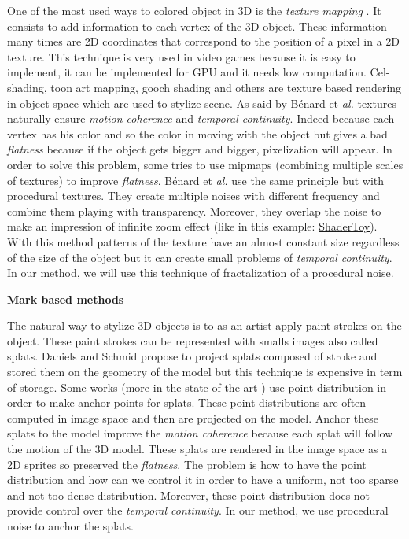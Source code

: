 One of the most used ways to colored object in 3D is the \textit{texture mapping} \cite{texture_mapping}. It consists to add information to each vertex of the 3D object. These information many times are 2D coordinates that correspond to the position of a pixel in a 2D texture. This technique is very used in video games because it is easy to implement, it can be implemented for GPU and it needs low computation. Cel-shading, toon art mapping, gooch shading and others\cite{benard_state---art_2011} are texture based rendering in object space\cite{praun_real-time_2001, klein_non-photorealistic_2000, benard_dynamic_2009, benard_dynamic_2010, freudenberg_walk-through_2001} which are used to stylize scene. As said by Bénard et \textit{al.} \cite{benard_dynamic_2009} textures naturally ensure \textit{motion coherence} and \textit{temporal continuity}. Indeed because each vertex has his color and so the color in moving with the object but gives a bad \textit{flatness} because if the object gets bigger and bigger, pixelization will appear. In order to solve this problem, some\cite{klein_non-photorealistic_2000, benard_dynamic_2009} tries to use mipmaps (combining multiple scales of textures) to improve \textit{flatness}. Bénard et \textit{al.}\cite{benard_dynamic_2010} use the same principle but with procedural textures. They create multiple noises with different frequency and combine them playing with transparency. Moreover, they overlap the noise to make an impression of infinite zoom effect (like in this example: \href{https://www.shadertoy.com/view/XlBXWw?fbclid=IwAR1fU2JxQzXtks1ZcmVmzrHiv646G8w2gWceeiV-UToeFkAFMQ2NecbsGGs}{ShaderToy}). With this method patterns of the texture have an almost constant size regardless of the size of the object but it can create small problems of \textit{temporal continuity}. In our method, we will use this technique of fractalization of a procedural noise.



\textbf{Mark based methods}

The natural way to stylize 3D objects is to as an artist apply paint strokes on the object. These paint strokes can be represented with smalls images also called splats. Daniels\cite{Daniels_1999} and Schmid\cite{schmid_overcoat} propose to project splats composed of stroke and stored them on the geometry of the model but this technique is expensive in term of storage. Some works \cite{meier_painterly_1996, Fekete_2000, chi_stylized_2006}(more in the state of the art \cite{benard_state---art_2011}) use point distribution in order to make anchor points for splats. These point distributions are often computed in image space and then are projected on the model. Anchor these splats to the model improve the \textit{motion coherence} because each splat will follow the motion of the 3D model. These splats are rendered in the image space as a 2D sprites so preserved the \textit{flatness}. The problem is how to have the point distribution and how can we control it in order to have a uniform, not too sparse and not too dense distribution. Moreover, these point distribution does not provide control over the \textit{temporal continuity}. In our method, we use procedural noise to anchor the splats.


